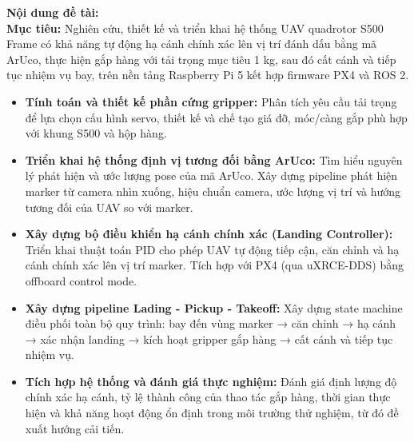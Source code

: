 \begin{mdframed}[style=decuongfield]
\vspace{1mm}
  \textbf{Nội dung đề tài:}\\
\textbf{Mục tiêu:} Nghiên cứu, thiết kế và triển khai hệ thống UAV 
  quadrotor S500 Frame có khả năng tự động hạ cánh chính 
  xác lên vị trí đánh dấu bằng mã ArUco, thực hiện gắp hàng với 
  tải trọng mục tiêu 1 kg, sau đó cất cánh và tiếp tục nhiệm vụ 
  bay, trên nền tảng Raspberry Pi 5 kết hợp firmware PX4 và ROS 2.
\begin{itemize}
\item \textbf{Tính toán và thiết kế phần cứng gripper:} 
    Phân tích yêu cầu tải trọng để lựa chọn cấu hình servo,
    thiết kế và chế tạo giá đỡ, móc/càng gắp phù hợp 
    với khung S500 và hộp hàng.
\item \textbf{Triển khai hệ thống định vị tương đối bằng ArUco:}
    Tìm hiểu nguyên lý phát hiện và ước lượng pose của mã ArUco. 
    Xây dựng pipeline phát hiện marker từ camera nhìn xuống, 
    hiệu chuẩn camera, ước lượng vị trí và hướng tương đối của 
    UAV so với marker.
\item \textbf{Xây dựng bộ điều khiển hạ cánh chính xác (Landing Controller):}
    Triển khai thuật toán PID cho phép UAV tự động tiếp cận,
     căn chỉnh và hạ cánh chính xác lên vị trí marker.
      Tích hợp với PX4 (qua uXRCE-DDS) bằng offboard control mode.
\item \textbf{Xây dựng pipeline Lading - Pickup - Takeoff:}
    Xây dựng state machine điều phối toàn bộ quy trình: 
    bay đến vùng marker → căn chỉnh → hạ cánh → xác nhận landing
     → kích hoạt gripper gắp hàng → cất cánh và tiếp tục 
     nhiệm vụ. 
\item \textbf{Tích hợp hệ thống và đánh giá thực nghiệm:}
    Đánh giá định lượng độ chính xác hạ cánh, tỷ lệ thành công của thao tác gắp hàng, thời gian thực hiện và khả năng hoạt động ổn định trong môi trường thử nghiệm, từ đó đề xuất hướng cải tiến.
\end{itemize}
\par\vspace{-1mm}
\noindent\makebox[\linewidth][l]{\hspace*{-2.5mm}\rule{\dimexpr\linewidth+5mm\relax}{0.4pt}}\par



\end{mdframed}
